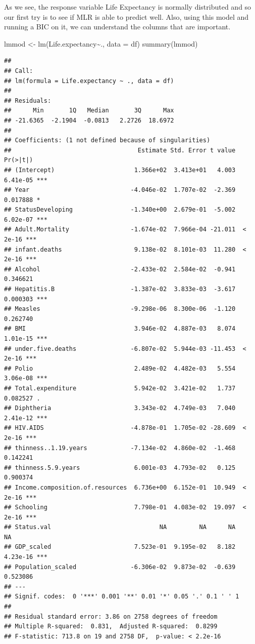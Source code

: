 \documentclass[
]{article}
\newenvironment{Shaded}{\begin{snugshade}}{\end{snugshade}}
\newcommand{\AttributeTok}[1]{\textcolor[rgb]{0.77,0.63,0.00}{#1}}
\newcommand{\FunctionTok}[1]{\textcolor[rgb]{0.00,0.00,0.00}{#1}}
\newcommand{\NormalTok}[1]{#1}
\newcommand{\OtherTok}[1]{\textcolor[rgb]{0.56,0.35,0.01}{#1}}
\newcommand{\SpecialCharTok}[1]{\textcolor[rgb]{0.00,0.00,0.00}{#1}}
\begin{document}
As we see, the response variable Life Expectancy is normally distributed
and so our first try is to see if MLR is able to predict well. Also,
using this model and running a BIC on it, we can understand the columns
that are important.

\begin{Shaded}
\begin{Highlighting}[]
\NormalTok{lmmod }\OtherTok{\textless{}{-}} \FunctionTok{lm}\NormalTok{(Life.expectancy}\SpecialCharTok{\textasciitilde{}}\NormalTok{., }\AttributeTok{data =}\NormalTok{ df)}
\FunctionTok{summary}\NormalTok{(lmmod)}
\end{Highlighting}
\end{Shaded}

\begin{verbatim}
## 
## Call:
## lm(formula = Life.expectancy ~ ., data = df)
## 
## Residuals:
##      Min       1Q   Median       3Q      Max 
## -21.6365  -2.1904  -0.0813   2.2726  18.6972 
## 
## Coefficients: (1 not defined because of singularities)
##                                   Estimate Std. Error t value Pr(>|t|)    
## (Intercept)                      1.366e+02  3.413e+01   4.003 6.41e-05 ***
## Year                            -4.046e-02  1.707e-02  -2.369 0.017888 *  
## StatusDeveloping                -1.340e+00  2.679e-01  -5.002 6.02e-07 ***
## Adult.Mortality                 -1.674e-02  7.966e-04 -21.011  < 2e-16 ***
## infant.deaths                    9.138e-02  8.101e-03  11.280  < 2e-16 ***
## Alcohol                         -2.433e-02  2.584e-02  -0.941 0.346621    
## Hepatitis.B                     -1.387e-02  3.833e-03  -3.617 0.000303 ***
## Measles                         -9.298e-06  8.300e-06  -1.120 0.262740    
## BMI                              3.946e-02  4.887e-03   8.074 1.01e-15 ***
## under.five.deaths               -6.807e-02  5.944e-03 -11.453  < 2e-16 ***
## Polio                            2.489e-02  4.482e-03   5.554 3.06e-08 ***
## Total.expenditure                5.942e-02  3.421e-02   1.737 0.082527 .  
## Diphtheria                       3.343e-02  4.749e-03   7.040 2.41e-12 ***
## HIV.AIDS                        -4.878e-01  1.705e-02 -28.609  < 2e-16 ***
## thinness..1.19.years            -7.134e-02  4.860e-02  -1.468 0.142241    
## thinness.5.9.years               6.001e-03  4.793e-02   0.125 0.900374    
## Income.composition.of.resources  6.736e+00  6.152e-01  10.949  < 2e-16 ***
## Schooling                        7.798e-01  4.083e-02  19.097  < 2e-16 ***
## Status.val                              NA         NA      NA       NA    
## GDP_scaled                       7.523e-01  9.195e-02   8.182 4.23e-16 ***
## Population_scaled               -6.306e-02  9.873e-02  -0.639 0.523086    
## ---
## Signif. codes:  0 '***' 0.001 '**' 0.01 '*' 0.05 '.' 0.1 ' ' 1
## 
## Residual standard error: 3.86 on 2758 degrees of freedom
## Multiple R-squared:  0.831,  Adjusted R-squared:  0.8299 
## F-statistic: 713.8 on 19 and 2758 DF,  p-value: < 2.2e-16
\end{verbatim}
\end{document}

